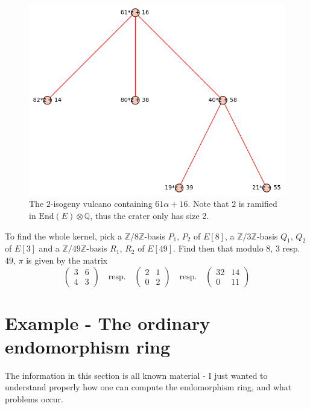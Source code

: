 \documentclass{scrartcl}
\newcommand{\Z}{\mathbb{Z}}
\newcommand{\End}{\mathrm{End}}
\theoremstyle{definition}
\begin{document}
\begin{figure}
    \includegraphics{./example_ramified.png}
    \caption{\label{fig:example_61z_16} The $2$-isogeny vulcano containing $61\alpha + 16$. Note that $2$ is ramified in $\End(E) \otimes \mathbb{Q}$, thus the crater only has size 2.}
\end{figure}

To find the whole kernel, pick a $\Z/8\Z$-basis $P_1$, $P_2$ of $E[8]$, a $\Z/3\Z$-basis $Q_1$, $Q_2$ of $E[3]$ and a $\Z/49\Z$-basis $R_1$, $R_2$ of $E[49]$.
Find then that modulo $8$, $3$ resp. $49$, $\pi$ is given by the matrix
\begin{equation*}
    \left(\begin{matrix*}
        3 & 6 \\ 4 & 3
    \end{matrix*}\right) \quad \text{resp.} \quad \left(\begin{matrix*}
        2 & 1 \\ 0 & 2
    \end{matrix*}\right) \quad \text{resp.} \quad \left(\begin{matrix*}
        32 & 14 \\ 0 & 11
    \end{matrix*}\right)
\end{equation*}

\section{Example - The ordinary endomorphism ring}
The information in this section is all known material - I just wanted to understand properly how one can compute the endomorphism ring, and what problems occur.
\end{document}
